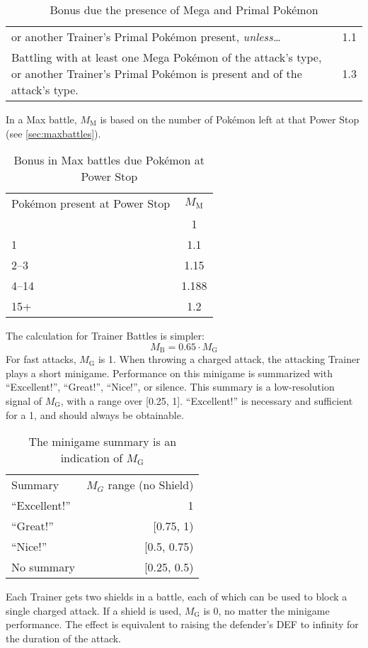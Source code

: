 \begin{itemize}
\begin{table}[h!]
\begin{tabular}{p{}c}
          or another Trainer's Primal Pokémon present, \textit{unless…} & 1.1 \\
         Battling with at least one Mega Pokémon of the attack's type,
          or another Trainer's Primal Pokémon is present and of
          the attack's type. & 1.3 \\
       \end{tabular}
     \caption{Bonus due the presence of Mega and Primal Pokémon}
   \end{table}
   In a Max battle, $M_\mathrm{M}$ is based on the number of Pokémon left at that Power Stop
     (see \autoref{sec:maxbattles}).
   \begin{table}[h!]
     \centering
       \begin{tabular}{lc}
         Pokémon present at Power Stop & $M_\mathrm{M}$ \\
         \Midrule
         0 & 1 \\
         1 & 1.1 \\
         2--3 & 1.15 \\
         4--14 & 1.188 \\
         15+ & 1.2 \\
       \end{tabular}
     \caption{Bonus in Max battles due Pokémon at Power Stop\label{table:powerstopbonus}}
   \end{table}
\end{itemize}
The calculation for Trainer Battles is simpler:
\[ M_\mathrm{B} = 0.65 \cdot M_\mathrm{G} \]
For fast attacks, $M_\mathrm{G}$ is 1.
When throwing a charged attack, the attacking Trainer plays a short minigame.
Performance on this minigame is summarized with ``Excellent!'', ``Great!'',
``Nice!'', or silence.
This summary is a low-resolution signal of $M_\mathrm{G}$, with a range over [0.25, 1].
``Excellent!'' is necessary and sufficient for a 1, and should always be obtainable.
\begin{table}
\centering
\begin{tabular}{l r}
Summary & $M_G$ range (no Shield) \\
\Midrule
``Excellent!'' & 1 \\
``Great!'' & [0.75, 1) \\
``Nice!'' & [0.5, 0.75) \\
No summary & [0.25, 0.5) \\
\end{tabular}
\caption{The minigame summary is an indication of $M_\mathrm{G}$}
\end{table}
Each Trainer gets two shields in a battle, each of which can be used
 to block a single charged attack.
If a shield is used, $M_\mathrm{G}$ is 0, no matter the minigame performance.
The effect is equivalent to raising the defender's DEF to infinity for the
  duration of the attack.

